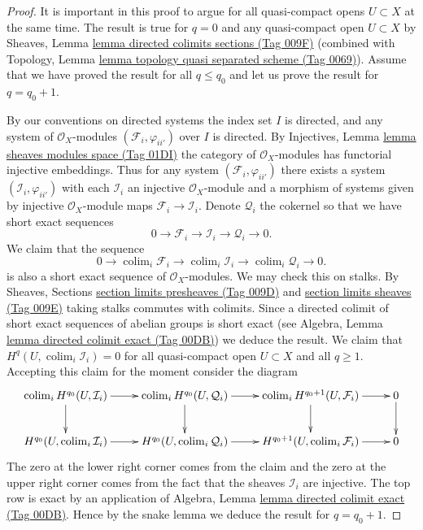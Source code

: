 \documentclass{amsart}
\theoremstyle{plain}
\theoremstyle{definition}
\theoremstyle{remark}
\numberwithin{equation}{subsection}
\def\colim{\mathop{\mathrm{colim}}\nolimits}
\begin{document}
\begin{proof}
It is important in this proof to argue for all quasi-compact opens
$U \subset X$ at the same time.
The result is true for $q = 0$ and any quasi-compact open $U \subset X$ by
Sheaves, Lemma \href{https://stacks.math.columbia.edu/tag/009F}{lemma directed colimits sections (Tag 009F)}
(combined with
Topology, Lemma \href{https://stacks.math.columbia.edu/tag/0069}{lemma topology quasi separated scheme (Tag 0069)}).
Assume that we have proved the result for all $q \leq q_0$ and let
us prove the result for $q = q_0 + 1$.

\medskip\noindent
By our conventions on directed systems the index set $I$ is directed,
and any system of $\mathcal{O}_X$-modules $(\mathcal{F}_i, \varphi_{ii'})$
over $I$ is directed.
By Injectives, Lemma \href{https://stacks.math.columbia.edu/tag/01DI}{lemma sheaves modules space (Tag 01DI)} the category
of $\mathcal{O}_X$-modules has functorial injective embeddings.
Thus for any system $(\mathcal{F}_i, \varphi_{ii'})$ there exists a
system $(\mathcal{I}_i, \varphi_{ii'})$ with each $\mathcal{I}_i$ an
injective $\mathcal{O}_X$-module and a morphism of systems given
by injective $\mathcal{O}_X$-module maps
$\mathcal{F}_i \to \mathcal{I}_i$. Denote $\mathcal{Q}_i$ the
cokernel so that we have short exact sequences
$$
0 \to
\mathcal{F}_i \to
\mathcal{I}_i \to
\mathcal{Q}_i \to 0.
$$
We claim that the sequence
$$
0 \to
\colim_i \mathcal{F}_i \to
\colim_i \mathcal{I}_i \to
\colim_i \mathcal{Q}_i \to 0.
$$
is also a short exact sequence of $\mathcal{O}_X$-modules.
We may check this on stalks. By
Sheaves, Sections \href{https://stacks.math.columbia.edu/tag/009D}{section limits presheaves (Tag 009D)}
and \href{https://stacks.math.columbia.edu/tag/009E}{section limits sheaves (Tag 009E)}
taking stalks commutes with colimits. Since a directed colimit
of short exact sequences of abelian groups is short exact
(see Algebra, Lemma \href{https://stacks.math.columbia.edu/tag/00DB}{lemma directed colimit exact (Tag 00DB)})
we deduce the result. We claim that
$H^q(U, \colim_i \mathcal{I}_i) = 0$ for all quasi-compact
open $U \subset X$ and all $q \geq 1$. Accepting this claim
for the moment consider the diagram
$$
\xymatrix{
\colim_i H^{q_0}(U, \mathcal{I}_i) \ar[d] \ar[r] &
\colim_i H^{q_0}(U, \mathcal{Q}_i) \ar[d] \ar[r] &
\colim_i H^{q_0 + 1}(U, \mathcal{F}_i) \ar[d] \ar[r] &
0 \ar[d] \\
H^{q_0}(U, \colim_i \mathcal{I}_i) \ar[r] &
H^{q_0}(U, \colim_i \mathcal{Q}_i) \ar[r] &
H^{q_0 + 1}(U, \colim_i \mathcal{F}_i) \ar[r] &
0
}
$$
The zero at the lower right corner comes from the claim and the
zero at the upper right corner comes from the fact that the sheaves
$\mathcal{I}_i$ are injective.
The top row is exact by an application of
Algebra, Lemma \href{https://stacks.math.columbia.edu/tag/00DB}{lemma directed colimit exact (Tag 00DB)}.
Hence by the snake lemma we deduce the
result for $q = q_0 + 1$.


\end{proof}
\end{document}
